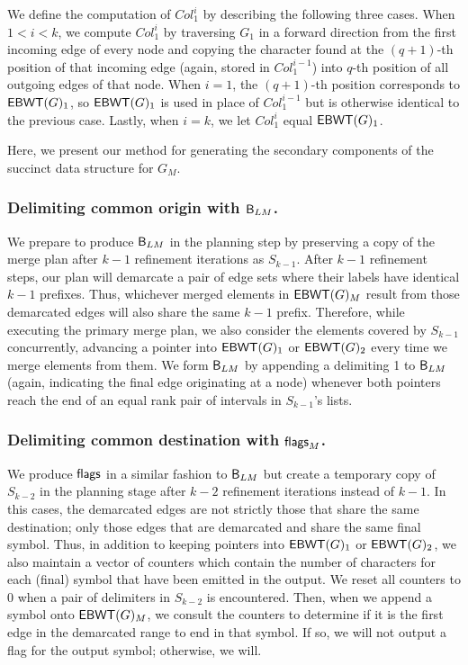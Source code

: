 We define the computation of $Col_1^i$  by describing the following three cases.  When $1 < i < k$, we compute $Col_1^i$ by traversing $G_1$ in a forward direction from the first incoming edge of every node and copying the character found at the $(q + 1)$-th position of that incoming edge (again, stored in $Col_1^{i-1}$) into $q$-th position of all outgoing edges of that node.  When $i = 1$, the $(q+1)$-th position corresponds to $\mathsf{EBWT}(G)_1$, so $\mathsf{EBWT}(G)_1$ is used in place of $Col_1^{i-1}$ but is otherwise identical to the previous case.  Lastly, when $i=k$, we let $Col_1^i$ equal $\mathsf{EBWT}(G)_1$.


Here, we present our method for generating the secondary components of the succinct data structure for $G_M$.

\subsubsection{Delimiting common origin with $\mathsf{B}_{LM}$.}
We prepare to produce $\mathsf{B}_{LM}$ in the planning step by preserving a copy of the merge plan after $k-1$ refinement iterations as $S_{k-1}$. After $k-1$ refinement steps, our plan will demarcate a pair of edge sets where their labels have identical $k-1$ prefixes.  Thus, whichever merged elements in $\mathsf{EBWT}(G)_M$ result from those demarcated edges will also share the same $k-1$ prefix. Therefore, while executing the primary merge plan, we also consider the elements covered by $S_{k-1}$ concurrently, advancing a pointer into $\mathsf{EBWT}(G)_1$ or $\mathsf{EBWT}(G)_2$ every time we merge elements from them. We form $\mathsf{B}_{LM}$ by appending a delimiting 1 to $\mathsf{B}_{LM}$ (again, indicating the final edge originating at a node) whenever both pointers reach the end of an equal rank pair of intervals in $S_{k-1}$'s lists.
\subsubsection{Delimiting common destination with $\mbox{\rm {\sf flags}}_M$.}
We produce $\mbox{\rm {\sf flags}}$ in a similar fashion to $\mathsf{B}_{LM}$ but create a temporary copy of $S_{k-2}$ in the planning stage after $k-2$ refinement iterations instead of $k-1$.  In this cases, the demarcated edges are not strictly those that share the same destination; only those edges that are demarcated and share the same final symbol.  Thus, in addition to keeping pointers into $\mathsf{EBWT}(G)_1$ or $\mathsf{EBWT}(G)_2$, we also maintain a vector of counters which contain the number of characters for each (final) symbol that have been emitted in the output. We reset all counters to $0$ when  a pair of delimiters in $S_{k-2}$  is encountered.  Then, when we append a symbol onto $\mathsf{EBWT}(G)_M$, we consult the counters to determine if it is the first edge in the demarcated range to end in that symbol.   If so, we will not output a flag for the output symbol; otherwise, we will.


